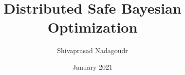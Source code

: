 \documentclass[mtech,project]{iist}
\title{Distributed Safe Bayesian Optimization}
\author{Shivaprasad Nadagoudr}
\date{January 2021}
\begin{document}
\maketitle %
\makecertificate %
\maketableofcontents %

\makechaptersettings 








\makebibsettings




\makeappendixsettings
%
%

\makeindexsettings
\end{document}
